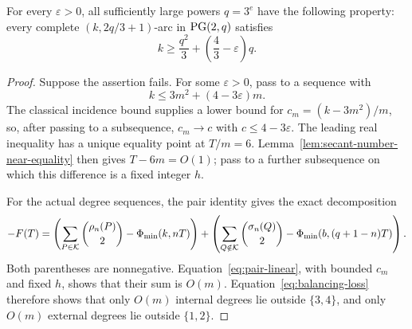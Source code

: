 \begin{proposition}
\label{prop:characteristic-three-modular-bound}
For every \(\varepsilon>0\), all sufficiently large powers \(q=3^e\) have
the following property: every complete \((k,2q/3+1)\)-arc in \(\mathrm{PG}(2,q)\)
satisfies
\[
 k\ge \frac{q^2}{3}+\left(\frac43-\varepsilon\right)q.
\]
\end{proposition}

\begin{proof}
Suppose the assertion fails.  For some \(\varepsilon>0\), pass to a sequence
with
\[
 k\le3m^2+(4-3\varepsilon)m.
\]
The classical incidence bound supplies a lower bound for
\(c_m=(k-3m^2)/m\), so, after passing to a subsequence, \(c_m\to c\) with
\(c\le4-3\varepsilon\).  The leading real inequality has a unique equality
point at \(T/m=6\).  Lemma~\ref{lem:secant-number-near-equality} then gives
\(T-6m=O(1)\); pass to a further subsequence on which this difference is a
fixed integer \(h\).

For the actual degree sequences, the pair identity gives the exact
decomposition
\[
 -F(T)=
 \left(\sum_{P\in\mathcal K}\binom{\rho_n(P)}2-\Phi_{\min}(k,nT)\right)
 +\left(\sum_{Q\notin\mathcal K}\binom{\sigma_n(Q)}2
              -\Phi_{\min}(b,(q+1-n)T)\right).
\]
Both parentheses are nonnegative.  Equation~\eqref{eq:pair-linear}, with
bounded \(c_m\) and fixed \(h\), shows that their sum is \(O(m)\).
Equation~\eqref{eq:balancing-loss} therefore shows that only \(O(m)\)
internal degrees lie outside \(\{3,4\}\), and only \(O(m)\) external degrees
lie outside \(\{1,2\}\).


\end{proof}
